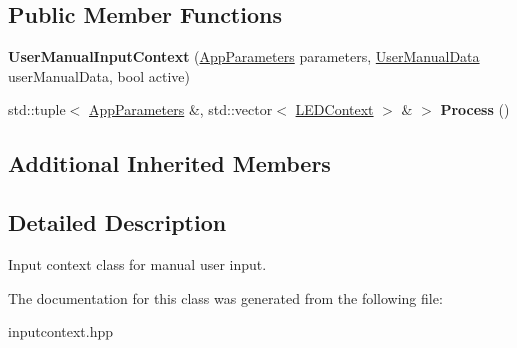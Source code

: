 \subsection*{Public Member Functions}
\begin{DoxyCompactItemize}
\item 
\mbox{\label{classUserManualInputContext_a3ee58341cb01d323935413b9b5cb80f2}} 
{\bfseries User\+Manual\+Input\+Context} (\hyperlink{structAppParameters}{App\+Parameters} parameters, \hyperlink{structUserManualData}{User\+Manual\+Data} user\+Manual\+Data, bool active)
\item 
\mbox{\label{classUserManualInputContext_aac7943547f0441ae5f2391985650b393}} 
std\+::tuple$<$ \hyperlink{structAppParameters}{App\+Parameters} \&, std\+::vector$<$ \hyperlink{classLEDContext}{L\+E\+D\+Context} $>$ \& $>$ {\bfseries Process} ()
\end{DoxyCompactItemize}
\subsection*{Additional Inherited Members}


\subsection{Detailed Description}
Input context class for manual user input. 

The documentation for this class was generated from the following file\+:\begin{DoxyCompactItemize}
\item 
inputcontext.\+hpp\end{DoxyCompactItemize}
